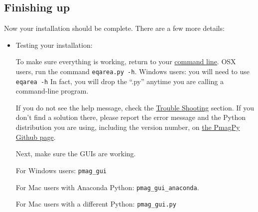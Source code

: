 \documentclass[11pt]{book}
\begin{document}
{   %


%
%

   \subsection{Finishing up}

    Now your installation should be complete.  There are a few more details:
    \begin{itemize}
\item Testing your installation:

To make sure everything is working, return to your \href{#command_line}{command line}. OSX users, run the command \texttt{eqarea.py -h}.      Windows users: you will need to use \texttt{eqarea -h}  In fact, you will drop the ``.py'' anytime you are calling a command-line program.

If you do not see the help message, check the \href{#trouble}{Trouble Shooting} section. If you don't find a solution there, please report the error message and  the Python distribution you are using, including the version number, on \href{https://github.com/PmagPy/PmagPy/issues}{the PmagPy Github page}.

Next, make sure the GUIs are working.

For Windows users: \texttt{pmag_gui}

For Mac users with Anaconda Python: \texttt{pmag_gui_anaconda}.

For Mac users with a different Python: \texttt{pmag_gui.py}


\end{itemize}}
\end{document}
